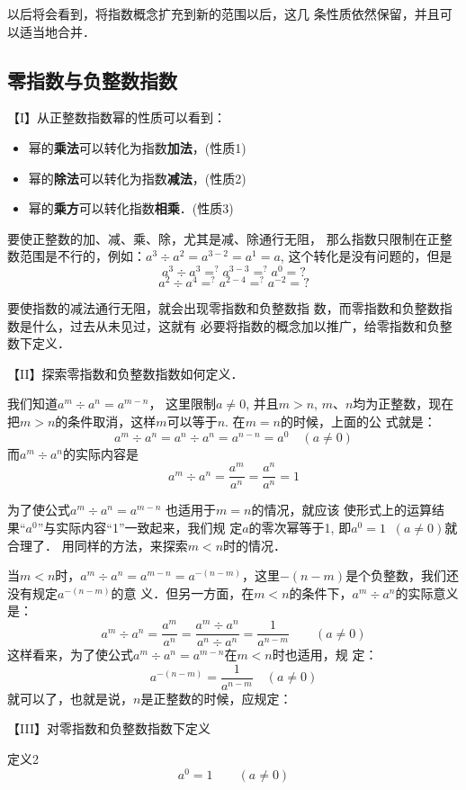 以后将会看到，将指数概念扩充到新的范围以后，这几
条性质依然保留，并且可以适当地合并．

\subsection{零指数与负整数指数}

【I】从正整数指数幂的性质可以看到：
\begin{itemize}
    \item 幂的\textbf{乘法}可以转化为指数\textbf{加法}，(性质1)
    \item 幂的\textbf{除法}可以转化为指数\textbf{减法}，(性质2)
    \item 幂的\textbf{乘方}可以转化指数\textbf{相乘}．(性质3)
\end{itemize}

要使正整数的加、减、乘、除，尤其是减、除通行无阻，
那么指数只限制在正整数范围是不行的，例如：$a^3\div a^2=
a^{3-2}=a^1=a$, 这个转化是没有问题的，但是
\[a^3\div a^3 \mathop{=}^{?} a^{3-3} \mathop{=}^{?} a^0=?\]
\[a^2\div a^4 \mathop{=}^{?} a^{2-4} \mathop{=}^{?} a^{-2}=?\]

要使指数的减法通行无阻，就会出现零指数和负整数指
数，而零指数和负整数指数是什么，过去从未见过，这就有
必要将指数的概念加以推广，给零指数和负整数下定义．

【II】探索零指数和负整数指数如何定义．

我们知道$a^m\div a^n=a^{m-n}$，
这里限制$a\ne 0$, 并且$m>n$, $m$、$n$均为正整数，现在把$m>
n$的条件取消，这样$m$可以等于$n$. 在$m=n$的时候，上面的公
式就是：
\[a^m\div a^n=a^n\div a^n=a^{n-n}=a^0\quad (a\ne 0)\]
而$a^m\div a^n$的实际内容是
\[a^m\div a^n=\frac{a^m}{a^n}=\frac{a^n}{a^n}=1\]

为了使公式$a^m\div a^n=a^{m-n}$
也适用于$m=n$的情况，就应该
使形式上的运算结果“$a^0$”与实际内容“1”一致起来，我们规
定$a$的零次幂等于1, 即$a^0=1\;\;  (a\ne 0)$就合理了．
用同样的方法，来探索$m<n$时的情况．

当$m<n$时，$a^m\div a^n=a^{m-n}=a^{-(n-m)}$，这里$-(n-m)$是个负整数，我们还没有规定$a^{-(n-m)}$的意
义．但另一方面，在$m<n$的条件下，$a^m\div a^n$的实际意义是：
\[a^m\div a^n=\frac{a^m}{a^n}=\frac{a^m\div a^n}{a^n\div a^n}=\frac{1}{a^{n-m}}\qquad (a\ne 0)\]
这样看来，为了使公式$a^m\div a^n=a^{m-n}$在$m<n$时也适用，规
定：
\[a^{-(n-m)}=\frac{1}{a^{n-m}}\quad (a\ne 0)  \]
就可以了，也就是说，$n$是正整数的时候，应规定：


【III】对零指数和负整数指数下定义

\begin{blk}{定义2}
    \[a^0=1\qquad  (a\ne 0)\]
\end{blk}

